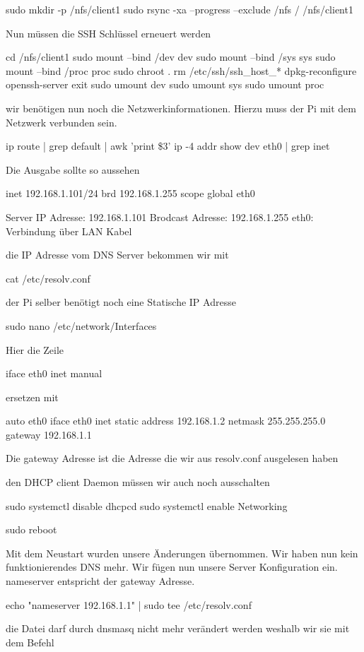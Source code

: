 \documentclass [a4paper,10pt] {article}
\begin{document}
			sudo mkdir -p /nfs/client1
			sudo rsync -xa --progress --exclude /nfs / /nfs/client1
			
			Nun müssen die SSH Schlüssel erneuert werden
			
			cd /nfs/client1
			sudo mount --bind /dev dev
			sudo mount --bind /sys sys
			sudo mount --bind /proc proc
			sudo chroot .
			rm /etc/ssh/ssh\_host\_*
			dpkg-reconfigure openssh-server
			exit
			sudo umount dev
			sudo umount sys
			sudo umount proc
			
			wir benötigen nun noch die Netzwerkinformationen. Hierzu muss der Pi mit dem Netzwerk verbunden sein.
			
			ip route | grep default | awk '{print \$3}'
			ip -4 addr show dev eth0 | grep inet
			
			Die Ausgabe sollte so aussehen
			
			inet 192.168.1.101/24 brd 192.168.1.255 scope global eth0
			
			Server IP Adresse: 192.168.1.101
			Brodcast Adresse: 192.168.1.255
			eth0: Verbindung über LAN Kabel
			
			die IP Adresse vom DNS Server bekommen wir mit 
			
			cat /etc/resolv.conf
			
			der Pi selber benötigt noch eine Statische IP Adresse
			
			sudo nano /etc/network/Interfaces
			
			Hier die Zeile 
			
			iface eth0 inet manual 
			
			ersetzen mit 
			
			auto eth0
			iface eth0 inet static 
				address 192.168.1.2
				netmask 255.255.255.0
				gateway 192.168.1.1
				
			Die gateway Adresse ist die Adresse die wir aus resolv.conf ausgelesen haben
			
			den DHCP client Daemon müssen wir auch noch ausschalten
			
			sudo systemctl disable dhcpcd
			sudo systemctl enable Networking
			
			sudo reboot
			
			Mit dem Neustart wurden unsere Änderungen übernommen. Wir haben nun kein funktionierendes DNS mehr. Wir fügen nun unsere Server Konfiguration ein. nameserver entspricht der gateway Adresse.
			 
			echo "nameserver 192.168.1.1" | sudo tee /etc/resolv.conf
			
			die Datei darf durch dnsmasq nicht mehr verändert werden weshalb wir sie mit dem Befehl
			
\end{document}

